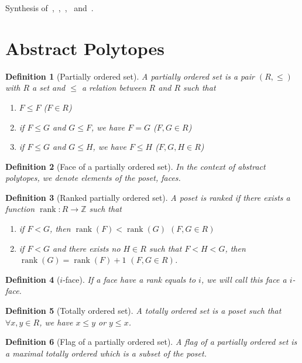 \documentclass[a4paper]{article}
\theoremstyle{mytheorem}
\newtheorem{definition}{Definition}[section]
\DeclareMathOperator{\rank}{rank}
\begin{document}
Synthesis of~\cite{highestRankOfAn},~\cite{A12PolytopesRank},~\cite{highRankAlternating},~\cite{bookIncidenceGeometry} and~\cite{cprGraph}.

\section{Abstract Polytopes}

\begin{definition}[Partially ordered set]
  A \textit{partially ordered set} is a pair $(R,\le)$ with $R$ a set and $\le$ a relation between $R$ and $R$ such that
  \begin{enumerate}
    \item $F \le F$ ($F \in R$)
    \item if $F \le G$ and $G \le F$, we have $F=G$ ($F,G \in R$)
    \item if $F \le G$ and $G \le H$, we have $F \le H$ ($F,G,H \in R$)
  \end{enumerate}
\end{definition}

\begin{definition}[Face of a partially ordered set]
  In the context of abstract polytopes, we denote elements of the poset, \textit{faces}.
\end{definition}

\begin{definition}[Ranked partially ordered set]
  A poset is ranked if there exists a function $\rank : R \to \mathbb Z$ such that
  \begin{enumerate}
    \item if $F < G$, then $\rank(F) < \rank(G)$ $(F, G \in R)$
    \item if $F < G$ and there exists no $H \in R$ such that $F < H < G$, then $\rank(G) = \rank(F) + 1$ $(F, G \in R)$.
  \end{enumerate}
\end{definition}

\begin{definition}[$i$-face]
  If a face have a rank equals to $i$, we will call this face a $i$-face.
\end{definition}

\begin{definition}[Totally ordered set]
  A \textit{totally ordered set} is a poset such that $\forall x,y \in R$, we have $x \le y$ or $y \le x$.
\end{definition}

\begin{definition}[Flag of a partially ordered set]
  A \textit{flag} of a partially ordered set is a maximal totally ordered which is a subset of the poset.
\end{definition}
\end{document}
